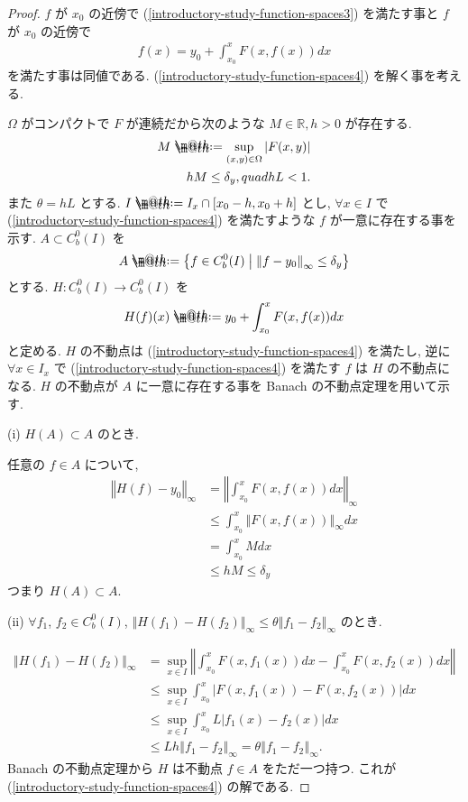 \documentclass[openany, a4paper, oneside]{jsbook}
\makeatletter
\newcommand*{\defeq}{\mathrel{\rlap{%
\raisebox{0.3ex}{$\m@th\cdot$}}%
\raisebox{-0.3ex}{$\m@th\cdot$}}%
=}
\theoremstyle{break}
\theoremstyle{breakdefn}
\newcommand{\abs}[1]{\left|#1\right|}
\newcommand{\norm}[1]{\left\Vert#1\right\Vert}
\newcommand{\sqbk}[1]{\left[#1\right]}
\newcommand{\relmiddle}[1]{\mathrel{}\middle#1\mathrel{}}
\newcommand{\set}[2]{\left\{#1 \relmiddle| #2\right\}}
\newcommand{\bbR}{\mathbb{R}}
\makeatother
\begin{document}
\begin{proof}
$f$ が $x_0$ の近傍で (\ref{introductory-study-function-spaces3}) を満たす事と $f$ が $x_0$ の近傍で
\begin{align}
 f(x)
 =
 y_0 + \int_{x_0}^{x} F(x, f(x)) dx \label{introductory-study-function-spaces4}
\end{align}
を満たす事は同値である.
(\ref{introductory-study-function-spaces4}) を解く事を考える.

$\Omega$ がコンパクトで $F$ が連続だから次のような $M \in \bbR, h > 0$ が存在する.
\begin{align*}
 M
 \defeq
 \sup_{(x, y) \in \Omega} \abs{F(x, y)} \\
 hM
 \leq
 \delta_y, quad hL < 1.
\end{align*}
また $\theta=hL$ とする.
$I \defeq I_x \cap \sqbk{x_0 - h, x_0 + h}$ とし,
$\forall x \in I$ で (\ref{introductory-study-function-spaces4}) を満たすような $f$ が一意に存在する事を示す.
$A \subset C^0_b(I)$ を
\begin{align*}
 A
 \defeq
 \set{f \in C^0_b(I)}{\norm{f - y_0}_{\infty} \leq \delta_y}
\end{align*}
とする.
$H \colon C^0_b(I) \to C^0_b(I)$ を
\begin{align*}
 H(f)(x)
 \defeq
 y_0 + \int_{x_0}^{x} F(x, f(x)) dx
\end{align*}
と定める.
$H$ の不動点は (\ref{introductory-study-function-spaces4}) を満たし,
逆に $\forall x \in I_x$ で (\ref{introductory-study-function-spaces4}) を満たす $f$ は $H$ の不動点になる.
$H$ の不動点が $A$ に一意に存在する事を Banach の不動点定理を用いて示す.

(i) $H(A) \subset A$ のとき.

任意の $f\in A$ について,
\begin{align*}
 \norm{H(f) - y_0}_{\infty}
 &=
 \norm{\int_{x_0}^{x}F(x, f(x))dx}_{\infty} \\
 &\leq
 \int_{x_0}^{x} \norm{F(x, f(x))}_{\infty} dx \\
 &=
 \int_{x_0}^{x} M dx \\
 &\leq
 hM
 \leq
 \delta_y
\end{align*}
つまり  $H(A) \subset A$.

(ii) $\forall f_1$, $f_2 \in C^0_b(I)$, $\norm{H(f_1) - H(f_2)}_{\infty} \leq \theta \norm{f_1 - f_2}_{\infty}$ のとき.

\begin{align*}
 \norm{H(f_1) - H(f_2)}_{\infty}
 &=
 \sup_{x \in I} \norm{\int_{x_0}^{x} F(x, f_1(x)) dx - \int_{x_0}^{x} F(x, f_2(x)) dx} \\
 &\leq
 \sup_{x \in I} \int_{x_0}^{x} \abs{F(x, f_1(x)) - F(x, f_2(x))} dx \\
 &\leq
 \sup_{x \in I} \int_{x_0}^{x} L \abs{f_1(x) - f_2(x)} dx \\
 &\leq
 Lh \norm{f_1 - f_2}_{\infty}
 =
 \theta \norm{f_1 - f_2}_{\infty}.
\end{align*}
Banach の不動点定理から $H$ は不動点 $f \in A$ をただ一つ持つ.
これが (\ref{introductory-study-function-spaces4}) の解である.
\end{proof}
\end{document}
